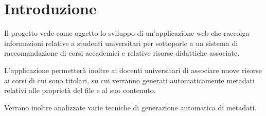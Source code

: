 %
\chapter*{Introduzione}                 %

Il progetto vede come oggetto lo sviluppo di un'applicazione web che raccolga informazioni relative a studenti universitari per sottoporle a un sistema di raccomandazione di corsi accademici e relative risorse didattiche associate.

\vspace{5mm}

L'applicazione permetterà inoltre ai docenti universitari di associare nuove risorse ai corsi di cui sono titolari, su cui verranno generati automaticamente metadati relativi alle proprietà del file e al suo contenuto.

\vspace{5mm}

Verrano inoltre analizzate varie tecniche di generazione automatica di metadati.

\clearpage{\pagestyle{empty}\cleardoublepage}